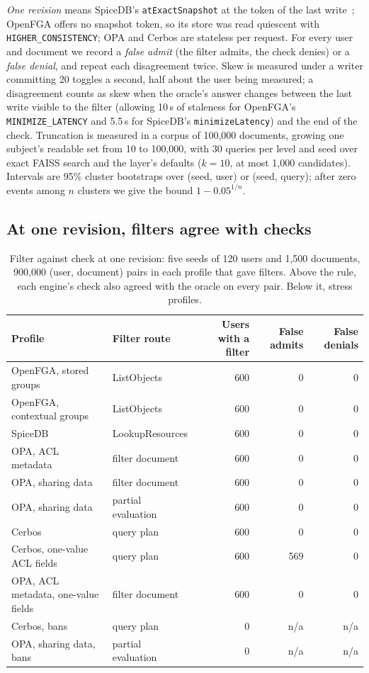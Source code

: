 \emph{One revision} means SpiceDB's \texttt{atExactSnapshot} at the token of the last
write~\cite{pang2019zanzibar,authzed2026consistency}; OpenFGA offers no snapshot token, so its store
was read quiescent with \texttt{HIGHER\_CONSISTENCY}; OPA and Cerbos are stateless per request. For
every user and document we record a \emph{false admit} (the filter admits, the check denies) or a
\emph{false denial}, and repeat each disagreement twice. Skew is measured under a writer committing
20 toggles a second, half about the user being measured; a disagreement counts as skew when the
oracle's answer changes between the last write visible to the filter (allowing 10\,s of staleness for
OpenFGA's \texttt{MINIMIZE\_LATENCY} and 5.5\,s for SpiceDB's \texttt{minimizeLatency}) and the end
of the check. Truncation is measured in a corpus of 100,000 documents, growing one subject's readable
set from 10 to 100,000, with 30 queries per level and seed over exact FAISS search and the layer's
defaults ($k = 10$, at most 1,000 candidates). Intervals are 95\% cluster bootstraps over (seed,
user) or (seed, query); after zero events among $n$ clusters we give the bound $1 - 0.05^{1/n}$.

\subsection{At one revision, filters agree with checks}\label{sec:eng-agree}

\begin{table}[tbp]
\centering
\footnotesize
\begin{tabular}{@{}llrrr@{}}
\toprule
Profile & Filter route & Users with a filter & False admits & False denials \\
\midrule
OpenFGA, stored groups & ListObjects & 600 & 0 & 0 \\
OpenFGA, contextual groups & ListObjects & 600 & 0 & 0 \\
SpiceDB & LookupResources & 600 & 0 & 0 \\
OPA, ACL metadata & filter document & 600 & 0 & 0 \\
OPA, sharing data & filter document & 600 & 0 & 0 \\
OPA, sharing data & partial evaluation & 600 & 0 & 0 \\
Cerbos & query plan & 600 & 0 & 0 \\
\midrule
Cerbos, one-value ACL fields & query plan & 600 & 569 & 0 \\
OPA, ACL metadata, one-value fields & filter document & 600 & 0 & 0 \\
Cerbos, bans & query plan & 0 & n/a & n/a \\
OPA, sharing data, bans & partial evaluation & 0 & n/a & n/a \\
\bottomrule
\end{tabular}
\caption{Filter against check at one revision: five seeds of 120 users and 1,500 documents, 900,000
(user, document) pairs in each profile that gave filters. Above the rule, each engine's check also agreed with the
oracle on every pair. Below it, stress profiles.}
\label{tab:eng-agree}
\end{table}

